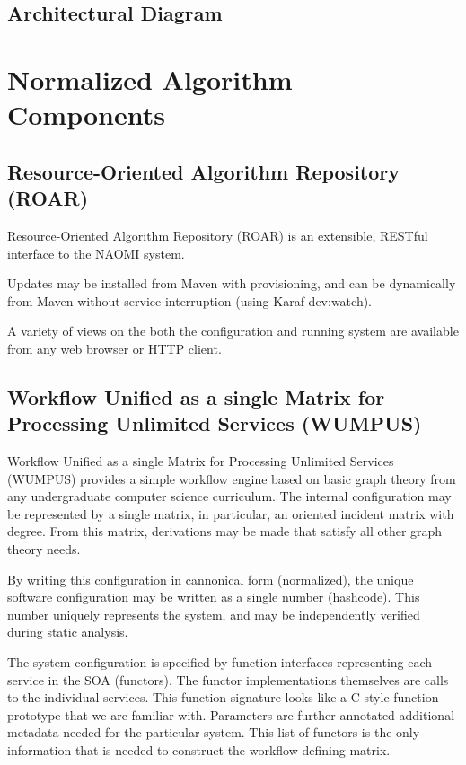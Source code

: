 \documentclass{article}[11pt]
\begin{document}
\subsection{Architectural Diagram}

\section{Normalized Algorithm Components}

\subsection{Resource-Oriented Algorithm Repository (ROAR)}

\par 
Resource-Oriented Algorithm Repository (ROAR) is an extensible, RESTful interface to the NAOMI system.

\par 
Updates may be installed from Maven with provisioning, and can be dynamically from Maven without service interruption (using Karaf dev:watch).

\par 
A variety of views on the both the configuration and running system are available from any web browser or HTTP client.


\subsection{Workflow Unified as a single Matrix for Processing Unlimited Services (WUMPUS)}

\par 
Workflow Unified as a single Matrix for Processing Unlimited Services (WUMPUS) provides a simple workflow engine based on basic graph theory from any undergraduate computer science curriculum.  The internal configuration may be represented by a single matrix, in particular, an oriented incident matrix with degree.  From this matrix, derivations may be made that satisfy all other graph theory needs.

\par 
By writing this configuration in cannonical form (normalized), the unique software configuration may be written as a single number (hashcode).  This number uniquely represents the system, and may be independently verified during static analysis.

\par 
The system configuration is specified by function interfaces representing each service in the SOA (functors).  The functor implementations themselves are calls to the individual services.  This function signature looks like a C-style function prototype that we are familiar with.  Parameters are further annotated additional metadata needed for the particular system.  This list of functors is the only information that is needed to construct the workflow-defining matrix.
\end{document}
